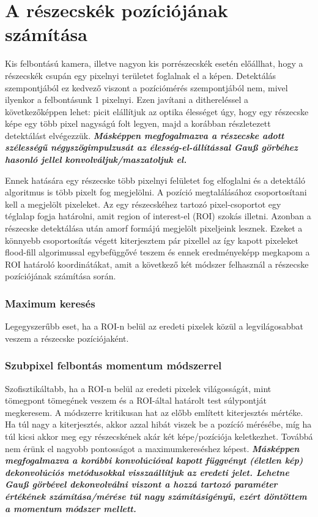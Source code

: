 \section{A részecskék pozíciójának számítása}
	Kis felbontású kamera, illetve nagyon kis porrészecskék esetén előállhat, hogy a részecskék csupán egy
	pixelnyi területet foglalnak el a képen. Detektálás szempontjából ez kedvező viszont a pozíciómérés
	szempontjából nem, mivel ilyenkor a felbontásunk 1 pixelnyi. Ezen javítani a dithereléssel a
	következőképpen lehet: picit elállítjuk az optika élességet úgy, hogy egy részecske képe egy több pixel nagyságú
	folt legyen, majd a korábban részletezett detektálást elvégezzük.
	\textit{\textbf{Másképpen megfogalmazva a részecske adott szélességű négyszögimpulzusát az élesség-el-állítással Gauß görbéhez
	hasonló jellel konvolváljuk/maszatoljuk el.}}
	
	Ennek hatására egy részecske több pixelnyi felületet fog elfoglalni és a detektáló algoritmus is
	több pixelt fog megjelölni. A pozíció megtalálásához csoportosítani kell a megjelölt pixeleket.
	Az egy részecskéhez tartozó pixel-csoportot egy téglalap fogja határolni, amit region of
	interest-el (ROI) szokás illetni. Azonban a részecske detektálása után amorf formájú megjelölt
	pixeljeink lesznek. Ezeket a könnyebb csoportosítás végett kiterjesztem pár pixellel az így kapott
	pixeleket flood-fill algorimussal egybefüggővé teszem és ennek eredményeképp megkapom a ROI határoló
	koordinátákat, amit a következő két módszer felhasznál a részecske pozíciójának számítása során.
	\subsubsection*{Maximum keresés}
	Legegyszerűbb eset, ha a ROI-n belül az eredeti pixelek közül a legvilágosabbat veszem a
	részecske pozíciójaként.
	\subsubsection*{Szubpixel felbontás momentum módszerrel}
	Szofisztikáltabb, ha a ROI-n belül az eredeti pixelek világosságát, mint tömegpont tömegének veszem
	és a ROI-által határolt test súlypontját megkeresem. A módszerre kritikusan hat az előbb említett
	kiterjesztés mértéke. Ha túl nagy a kiterjesztés, akkor azzal hibát viszek be a pozícíó mérésébe,
	míg ha túl kicsi akkor meg egy részecskének akár két képe/pozíciója keletkezhet. Továbbá nem érünk el nagyobb pontosságot a
	maximumkereséshez képest.
	\textit{\textbf{Másképpen megfogalmazva a korábbi konvolúcióval kapott függvényt (életlen kép) dekonvolúciós metódusokkal
	visszaállítjuk az eredeti jelet.
	Lehetne Gauß görbével dekonvolválni viszont a hozzá tartozó paraméter értékének számítása/mérése túl nagy számításigényű, ezért
	döntöttem a momentum módszer mellett.}}
	
